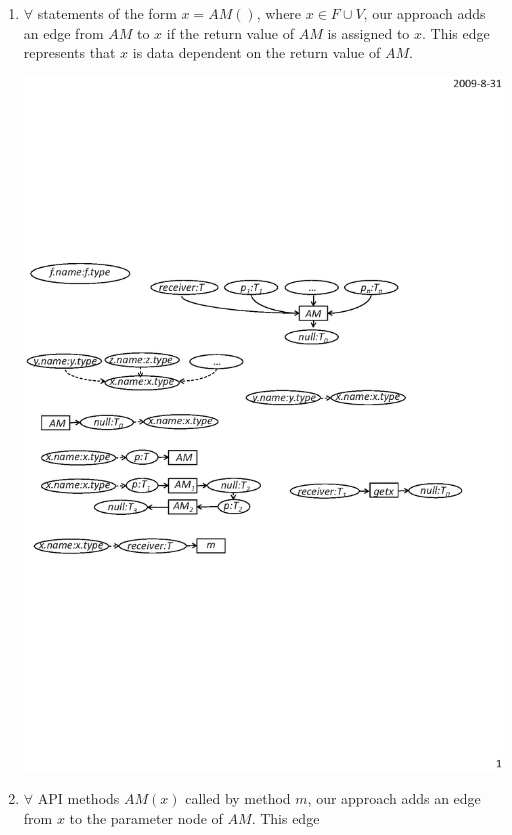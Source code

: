 \begin{enumerate}
\begin{center}
\end{center}\vspace*{-1.5ex}
\item $\forall$ statements of the form $x = AM()$, where $x \in F \cup V$, our approach
adds an edge from $AM$ to $x$ if the return value of $AM$ is
assigned to $x$. This edge represents that $x$ is data dependent on
the return value of $AM$. \vspace*{-1.5ex}
\begin{center}
\includegraphics[scale=0.7,clip]{figure/rule5.eps}%
\end{center}\vspace*{-1.5ex}
\item $\forall$ API methods $AM(x)$ called by method $m$, our approach
adds an edge from $x$ to the parameter node of $AM$. This edge

\end{enumerate}
